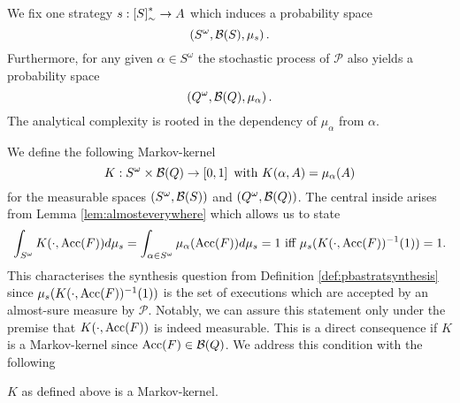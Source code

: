 We fix one strategy $s:\left[S\right]_{\sim}^{*}\rightarrow A$ which induces a 
probability space
\begin{equation*}
  \left(S^{\omega},\mathcal{B}(S), \mu_{s}\right).
\end{equation*}
Furthermore, for any given $\alpha\in S^{\omega}$ the stochastic process of
$\mathcal{P}$ also yields a probability space
\begin{equation*}
  \left(Q^{\omega},\mathcal{B}(Q), \mu_{\alpha}\right).
\end{equation*}
The analytical complexity is rooted in the dependency of $\mu_{\alpha}$ from
$\alpha$.

We define the following Markov-kernel
\begin{equation*}
  K:S^{\omega}\times\mathcal{B}(Q)\rightarrow\left[0,1\right]\text{ with }
    K(\alpha, A) = \mu_{\alpha}(A)
\end{equation*}
for the measurable spaces $\left(S^{\omega},\mathcal{B}(S)\right)$ and 
$\left(Q^{\omega},\mathcal{B}(Q)\right)$. The central inside arises from Lemma 
\ref{lem:almosteverywhere} which allows us to state
\begin{equation*}
  \int_{S^{\omega}}K(\cdot, \operatorname{Acc}(F)) d\mu_{s} 
  = \int_{\alpha\in S^{\omega}}\mu_{\alpha}(\operatorname{Acc}(F))d\mu_{s} = 1 \text{ iff }
    \mu_{s}(K(\cdot,\operatorname{Acc}(F))^{-1}(1)) = 1.
\end{equation*}
This characterises the synthesis question from Definition 
\ref{def:pbastratsynthesis} since $\mu_{s}(K(\cdot,\operatorname{Acc}(F))^{-1}(1))$ is the 
set of executions which are accepted by an almost-sure measure by 
$\mathcal{P}$. Notably, we can assure this statement only under the premise 
that $K(\cdot, \operatorname{Acc}(F))$ is indeed measurable. This is a direct consequence if 
$K$ is a Markov-kernel since $\operatorname{Acc}(F)\in\mathcal{B}(Q)$. We address this 
condition with the following
\begin{lemma}
  $K$ as defined above is a Markov-kernel.
\end{lemma}
